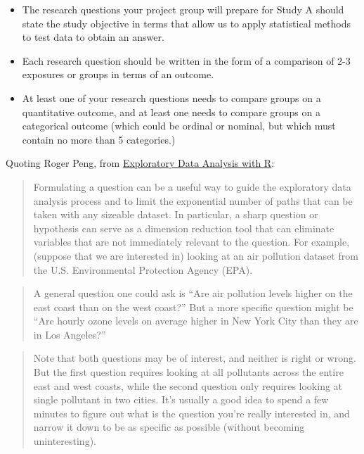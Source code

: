 \documentclass[]{book}
\providecommand{\tightlist}{%
  \setlength{\itemsep}{0pt}\setlength{\parskip}{0pt}}
\begin{document}
\begin{itemize}
\tightlist
\item
  The research questions your project group will prepare for Study A should state the study objective in terms that allow us to apply statistical methods to test data to obtain an answer.
\item
  Each research question should be written in the form of a comparison of 2-3 exposures or groups in terms of an outcome.
\item
  At least one of your research questions needs to compare groups on a quantitative outcome, and at least one needs to compare groups on a categorical outcome (which could be ordinal or nominal, but which must contain no more than 5 categories.)
\end{itemize}

Quoting Roger Peng, from \href{https://bookdown.org/rdpeng/exdata/}{Exploratory Data Analysis with R}:

\begin{quote}
Formulating a question can be a useful way to guide the exploratory data analysis process and to limit the exponential number of paths that can be taken with any sizeable dataset. In particular, a sharp question or hypothesis can serve as a dimension reduction tool that can eliminate variables that are not immediately relevant to the question. For example, (suppose that we are interested in) looking at an air pollution dataset from the U.S. Environmental Protection Agency (EPA).
\end{quote}

\begin{quote}
A general question one could ask is ``Are air pollution levels higher on the east coast than on the west coast?'' But a more specific question might be ``Are hourly ozone levels on average higher in New York City than they are in Los Angeles?''
\end{quote}

\begin{quote}
Note that both questions may be of interest, and neither is right or wrong. But the first question requires looking at all pollutants across the entire east and west coasts, while the second question only requires looking at single pollutant in two cities. It's usually a good idea to spend a few minutes to figure out what is the question you're really interested in, and narrow it down to be as specific as possible (without becoming uninteresting).
\end{quote}
\end{document}
